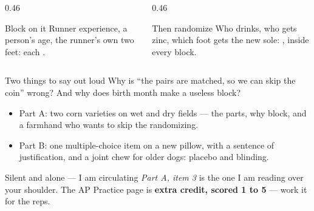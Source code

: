 \documentclass[aspectratio=169, 11pt]{beamer}
\begin{document}
\begin{frame}[t, plain]
  \vspace{6pt}
  \begin{columns}[t]
    \begin{column}{0.46\textwidth}
      \begin{block}{Block on it}
        Runner experience, a person's age, the runner's own two feet: each .
      \end{block}
    \end{column}
    \begin{column}{0.46\textwidth}
      \begin{block}{Then randomize}
        Who drinks, who gets zinc, which foot gets the new sole: ,
        inside every block.
      \end{block}
    \end{column}
  \end{columns}
  \vspace{12pt}
  \begin{block}{Two things to say out loud}
    Why is ``the pairs are matched, so we can skip the coin'' wrong? And why does birth month
    make a useless block?
  \end{block}
\end{frame}

\begin{frame}[t, plain]
  \begin{itemize}\setlength{\itemsep}{5pt}
    \item Part A: two corn varieties on wet and dry fields --- the parts, why block, and a
          farmhand who wants to skip the randomizing.
    \item Part B: one multiple-choice item on a new pillow, with a sentence of justification,
          and a joint chew for older dogs: placebo and blinding.
  \end{itemize}
  \begin{block}{Silent and alone --- I am circulating}
    \emph{Part A, item 3} is the one I am reading over your shoulder. The AP Practice page is
    \textbf{extra credit, scored 1 to 5} --- work it for the reps.
  \end{block}
\end{frame}
\end{document}

